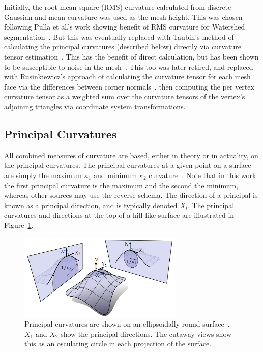 Initially, the root mean square (RMS) curvature calculated from discrete Gaussian and mean curvature was used as the mesh height.
This was chosen following Pulla et al.'s work showing benefit of RMS curvature for Watershed segmentation~\cite{Imp_k_estimation_for_WS}.
But this was eventually replaced with Taubin's method of calculating the principal curvatures (described below) directly via curvature tensor estimation~\cite{TaubinTensor}.
This has the benefit of direct calculation, but has been shown to be susceptible to noise in the mesh~\cite{Comp_k_notes}.
This too was later retired, and replaced with Rusinkiewicz's approach of calculating the curvature tensor for each mesh face via the differences between corner normals~\cite{SRTensor}, then computing the per vertex curvature tensor as a weighted sum over the curvature tensors of the vertex's adjoining triangles via coordinate system transformations.

\subsection{Principal Curvatures}
All combined measures of curvature are based, either in theory or in actuality, on the principal curvatures.
The principal curvatures at a given point on a surface are simply the maximum $\kappa_1$ and minimum $\kappa_2$ curvature~\cite{DDGAppIntro_17_smooth_k}.
Note that in this work the first principal curvature is the maximum and the second the minimum, whereas other sources may use the reverse schema.
The direction of a principal is known as a principal direction, and is typically denoted $X_i$.
The principal curvatures and directions at the top of a hill-like surface are illustrated in Figure~\ref{fig:principal_k}.

\begin{figure}[htb]
	\centering
	\includegraphics[width=0.7\textwidth]{../resources/curvature/principal_curvatures.png}
	\caption{
Principal curvatures are shown on an ellipsoidally round surface~\cite{Digital_geom_proc_w_disc_ext_calc}.
$X_1$ and $X_2$ show the principal directions.
The cutaway views show this as an osculating circle in each projection of the surface.
}
	\label{fig:principal_k}
\end{figure}

